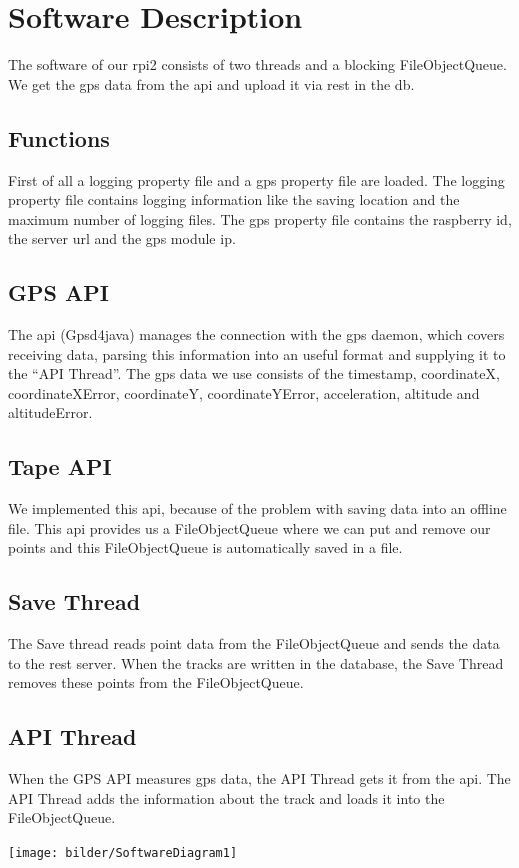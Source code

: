 \newpage
\section{Software Description}
The software of our \gls{rpi2} consists of two threads and a blocking FileObjectQueue. We get the \gls{gps} data from the \gls{api} and upload it via \gls{rest} in the \gls{db}. 
\subsection{Functions}
First of all a logging property file and a gps property file are loaded. The logging property file contains logging information like the saving location and the maximum number of logging files. The gps property file contains the raspberry id, the server \gls{url} and the gps module \gls{ip}.
\subsection{GPS API}
The \gls{api} (Gpsd4java) manages the connection with the \gls{gps} daemon, which covers receiving data, parsing this information into an useful format and supplying it to the “API Thread”. The \gls{gps} data we use consists of the timestamp, coordinateX, coordinateXError, coordinateY, coordinateYError, acceleration, altitude and altitudeError.
\subsection{Tape API}
We implemented this \gls{api}, because of the problem with saving data into an offline file. This \gls{api} provides us a FileObjectQueue where we can put and remove our points and this FileObjectQueue is automatically saved in a file. 
\subsection{Save Thread}
The Save thread reads point data from the FileObjectQueue and sends the data to the \gls{rest} server. When the tracks are written in the database, the Save Thread removes these points from the FileObjectQueue.
\subsection{API Thread}
When the GPS API measures \gls{gps} data, the API Thread gets it from the \gls{api}. The API Thread adds the information about the track and loads it into the FileObjectQueue.
\begin{center}
\texttt{[image: bilder/SoftwareDiagram1]}
\end{center} 
